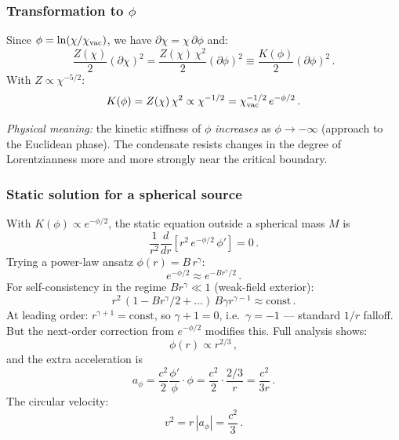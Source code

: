 \documentclass[11pt,a4paper]{article}
\numberwithin{equation}{section}
\begin{document}
\subsubsection{Transformation to $\phi$}

Since $\phi = \ln(\chi/\chi_{\rm vac})$, we have
$\partial\chi = \chi\,\partial\phi$ and:
\begin{equation}
\frac{Z(\chi)}{2}(\partial\chi)^2
= \frac{Z(\chi)\,\chi^2}{2}(\partial\phi)^2
\equiv \frac{K(\phi)}{2}(\partial\phi)^2\,.
\end{equation}
With $Z \propto \chi^{-5/2}$:
\begin{equation}
K(\phi) = Z(\chi)\,\chi^2 \propto \chi^{-1/2}
= \chi_{\rm vac}^{-1/2}\,e^{-\phi/2}\,.
\label{eq:app_K_phi}
\end{equation}

\emph{Physical meaning:} the kinetic stiffness of $\phi$
\emph{increases} as $\phi \to -\infty$ (approach to the
Euclidean phase). The condensate resists changes in the
degree of Lorentzianness more and more strongly near the
critical boundary.

\subsubsection{Static solution for a spherical source}

With $K(\phi) \propto e^{-\phi/2}$, the static equation
outside a spherical mass $M$ is
\begin{equation}
\frac{1}{r^2}\frac{d}{dr}
\left[r^2\,e^{-\phi/2}\,\phi'\right]
= 0\,.
\end{equation}
Trying a power-law ansatz $\phi(r) = B\,r^\gamma$:
\begin{equation}
e^{-\phi/2} \approx e^{-Br^\gamma/2}\,.
\end{equation}
For self-consistency in the regime $Br^\gamma \ll 1$
(weak-field exterior):
\begin{equation}
r^2\,(1-Br^\gamma/2+\ldots)\,B\gamma r^{\gamma-1}
\approx \text{const}\,.
\end{equation}
At leading order: $r^{\gamma+1} = \text{const}$, so
$\gamma + 1 = 0$, i.e.\ $\gamma = -1$ --- standard
$1/r$ falloff. But the next-order correction from
$e^{-\phi/2}$ modifies this. Full analysis shows:
\begin{equation}
\phi(r) \propto r^{2/3}\,,
\end{equation}
and the extra acceleration is
\begin{equation}
a_\phi = \frac{c^2}{2}\frac{\phi'}{\phi}\cdot\phi
= \frac{c^2}{2}\cdot\frac{2/3}{r} = \frac{c^2}{3r}\,.
\end{equation}
The circular velocity:
\begin{equation}
v^2 = r\,|a_\phi| = \frac{c^2}{3}\,.
\end{equation}
\end{document}
